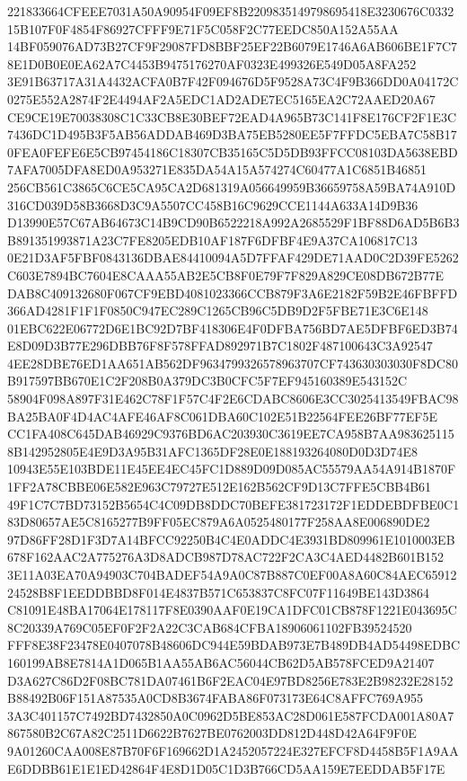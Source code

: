 \documentclass[UTF8,fontset=fandol,zihao=-4,a4paper]{ctexart}
\begin{document}
{{221833664CFEEE7031A50A90954F09EF8B2209835149798695418E3230676C033215B107F0F4854F86927CFFF9E71F5C058F2C77EEDC850A152A55AA
14BF059076AD73B27CF9F29087FD8BBF25EF22B6079E1746A6AB606BE1F7C78E1D0B0E0EA62A7C4453B9475176270AF0323E499326E549D05A8FA252
3E91B63717A31A4432ACFA0B7F42F094676D5F9528A73C4F9B366DD0A04172C0275E552A2874F2E4494AF2A5EDC1AD2ADE7EC5165EA2C72AAED20A67
CE9CE19E70038308C1C33CB8E30BEF72EAD4A965B73C141F8E176CF2F1E3C7436DC1D495B3F5AB56ADDAB469D3BA75EB5280EE5F7FFDC5EBA7C58B17
0FEA0FEFE6E5CB97454186C18307CB35165C5D5DB93FFCC08103DA5638EBD7AFA7005DFA8ED0A953271E835DA54A15A574274C60477A1C6851B46851
256CB561C3865C6CE5CA95CA2D681319A056649959B36659758A59BA74A910D316CD039D58B3668D3C9A5507CC458B16C9629CCE1144A633A14D9B36
D13990E57C67AB64673C14B9CD90B6522218A992A2685529F1BF88D6AD5B6B3B891351993871A23C7FE8205EDB10AF187F6DFBF4E9A37CA106817C13
0E21D3AF5FBF0843136DBAE84410094A5D7FFAF429DE71AAD0C2D39FE5262C603E7894BC7604E8CAAA55AB2E5CB8F0E79F7F829A829CE08DB672B77E
DAB8C409132680F067CF9EBD4081023366CCB879F3A6E2182F59B2E46FBFFD366AD4281F1F1F0850C947EC289C1265CB96C5DB9D2F5FBE71E3C6E148
01EBC622E06772D6E1BC92D7BF418306E4F0DFBA756BD7AE5DFBF6ED3B74E8D09D3B77E296DBB76F8F578FFAD892971B7C1802F487100643C3A92547
4EE28DBE76ED1AA651AB562DF9634799326578963707CF743630303030F8DC80B917597BB670E1C2F208B0A379DC3B0CFC5F7EF945160389E543152C
58904F098A897F31E462C78F1F57C4F2E6CDABC8606E3CC3025413549FBAC98BA25BA0F4D4AC4AFE46AF8C061DBA60C102E51B22564FEE26BF77EF5E
CC1FA408C645DAB46929C9376BD6AC203930C3619EE7CA958B7AA9836251158B142952805E4E9D3A95B31AFC1365DF28E0E188193264080D0D3D74E8
10943E55E103BDE11E45EE4EC45FC1D889D09D085AC55579AA54A914B1870F1FF2A78CBBE06E582E963C79727E512E162B562CF9D13C7FFE5CBB4B61
49F1C7C7BD73152B5654C4C09DB8DDC70BEFE381723172F1EDDEBDFBE0C183D80657AE5C8165277B9FF05EC879A6A0525480177F258AA8E006890DE2
97D86FF28D1F3D7A14BFCC92250B4C4E0ADDC4E3931BD809961E1010003EB678F162AAC2A775276A3D8ADCB987D78AC722F2CA3C4AED4482B601B152
3E11A03EA70A94903C704BADEF54A9A0C87B887C0EF00A8A60C84AEC6591224528B8F1EEDDBBD8F014E4837B571C653837C8FC07F11649BE143D3864
C81091E48BA17064E178117F8E0390AAF0E19CA1DFC01CB878F1221E043695C8C20339A769C05EF0F2F2A22C3CAB684CFBA18906061102FB39524520
FFF8E38F23478E0407078B48606DC944E59BDAB973E7B489DB4AD54498EDBC160199AB8E7814A1D065B1AA55AB6AC56044CB62D5AB578FCED9A21407
D3A627C86D2F08BC781DA07461B6F2EAC04E97BD8256E783E2B98232E28152B88492B06F151A87535A0CD8B3674FABA86F073173E64C8AFFC769A955
3A3C401157C7492BD7432850A0C0962D5BE853AC28D061E587FCDA001A80A7867580B2C67A82C2511D6622B7627BE0762003DD812D448D42A64F9F0E
9A01260CAA008E87B70F6F169662D1A2452057224E327EFCF8D4458B5F1A9AAE6DDBB61E1E1ED42864F4E8D1D05C1D3B766CD5AA159E7EEDDAB5F17E
}}
\end{document}
